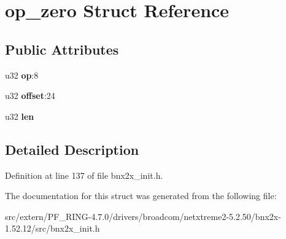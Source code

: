 \hypertarget{structop__zero}{
\section{op\_\-zero Struct Reference}
\label{structop__zero}
}
\subsection*{Public Attributes}
\begin{DoxyCompactItemize}
\item 
\hypertarget{structop__zero_aa95d3929c1d66097c8951ca0bb240ca9}{
u32 {\bfseries op}:8}
\label{structop__zero_aa95d3929c1d66097c8951ca0bb240ca9}

\item 
\hypertarget{structop__zero_a0923ca882a5ed5e3b9a7fbaa98d233d1}{
u32 {\bfseries offset}:24}
\label{structop__zero_a0923ca882a5ed5e3b9a7fbaa98d233d1}

\item 
\hypertarget{structop__zero_aa64fc53a76f518451f72656eb5aa7a09}{
u32 {\bfseries len}}
\label{structop__zero_aa64fc53a76f518451f72656eb5aa7a09}

\end{DoxyCompactItemize}


\subsection{Detailed Description}


Definition at line 137 of file bnx2x\_\-init.h.



The documentation for this struct was generated from the following file:\begin{DoxyCompactItemize}
\item 
src/extern/PF\_\-RING-\/4.7.0/drivers/broadcom/netxtreme2-\/5.2.50/bnx2x-\/1.52.12/src/bnx2x\_\-init.h\end{DoxyCompactItemize}
